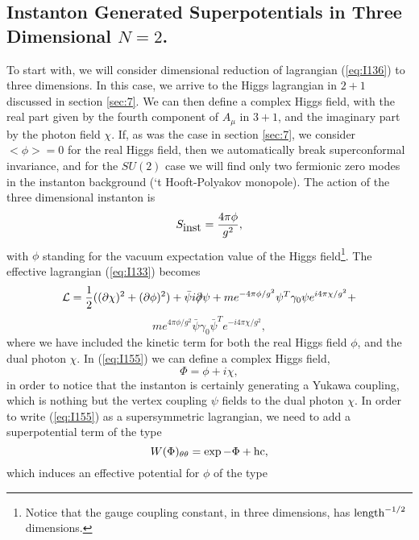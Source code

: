 \subsection{Instanton Generated Superpotentials in Three
Dimensional $N\!=\!2$.}
\label{sec:91}

To start with, we will consider dimensional reduction of
lagrangian (\ref{eq:I136}) to three dimensions. In this case, we
arrive to the Higgs lagrangian in $2+1$ discussed in section
\ref{sec:7}. We can then define a complex Higgs field, with the
real part given by the fourth component of $A_{\mu}$ in $3+1$,
and the imaginary part by the photon field $\chi$. If, as was
the case in section \ref{sec:7}, we consider $<\phi>=0$ for the
real Higgs field, then we automatically break superconformal
invariance, and for the $SU(2)$ case we will find only two
fermionic zero modes in the instanton background (`t
Hooft-Polyakov monopole). The action of the three dimensional
instanton is
\begin{equation}
S_{\hbox {inst}} = \frac {4\pi \phi}{g^2},
\label{eq:I154}
\end{equation}
with $\phi$ standing for the vacuum expectation value of the
Higgs field\footnote{Notice that the gauge coupling constant, in
three dimensions, has $\hbox {length}^{-1/2}$ dimensions.}. The
effective lagrangian (\ref{eq:I133}) becomes
\[
{\cal L} = \frac {1}{2} ((\partial \chi)^2+(\partial \phi)^2) +
\bar{\psi}i {\partial}\! \! \!  / \psi + m e^{-4\pi \phi/g^2} \psi^T
\gamma_0 \psi e^{i 4 \pi \chi/g^2} + \]
\begin{equation}
m e^{4 \pi \phi/g^2} \bar{\psi}\gamma_0\bar{\psi}^T e^{-i4 \pi
\chi/g^2},
\label{eq:I155}
\end{equation}
where we have included the kinetic term for both the real Higgs
field $\phi$, and the dual photon $\chi$. In (\ref{eq:I155}) we
can define a complex Higgs field,
\begin{equation}
\Phi = \phi + i \chi,
\label{eq:I156}
\end{equation}
in order to notice that the instanton is certainly generating a
Yukawa coupling, which is nothing but the vertex coupling $\psi$
fields to the dual photon $\chi$. In order to write (\ref{eq:I155}) 
as a supersymmetric lagrangian,
we need to add a superpotential term of the type \cite{AHW}
\begin{equation}
W(\Phi)_{\theta \theta} = \exp - \Phi + \hbox {hc},
\label{eq:I157}
\end{equation}
which induces an effective potential for $\phi$ of the type
